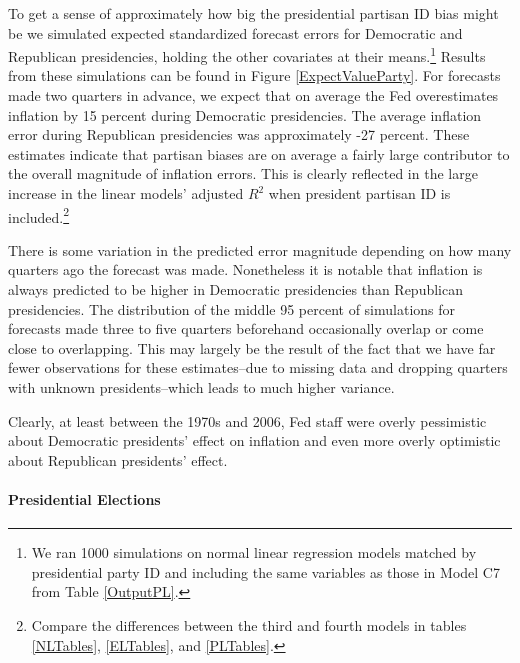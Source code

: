 \documentclass[a4paper]{article}\usepackage{graphicx, color}
\begin{document}
To get a sense of approximately how big the presidential partisan ID bias might be we simulated expected standardized forecast errors for Democratic and Republican presidencies, holding the other covariates at their means.\footnote{We ran 1000 simulations on normal linear regression models matched by presidential party ID and including the same variables as those in Model C7 from Table \ref{OutputPL}.} Results from these simulations can be found in Figure \ref{ExpectValueParty}. For forecasts made two quarters in advance, we expect that on average the Fed overestimates inflation by 15 percent during Democratic presidencies. The average inflation error during Republican presidencies was approximately -27 percent. These estimates indicate that partisan biases are on average a fairly large contributor to the overall magnitude of inflation errors. This is clearly reflected in the large increase in the linear models' adjusted $R^{2}$ when president partisan ID is included.\footnote{Compare the differences between the third and fourth models in tables \ref{NLTables}, \ref{ELTables}, and \ref{PLTables}.} 

There is some variation in the predicted error magnitude depending on how many quarters ago the forecast was made. Nonetheless it is notable that inflation is always predicted to be higher in Democratic presidencies than Republican presidencies. The distribution of the middle 95 percent of simulations for forecasts made three to five quarters beforehand occasionally overlap or come close to overlapping. This may largely be the result of the fact that we have far fewer observations for these estimates--due to missing data and dropping quarters with unknown presidents--which leads to much higher variance.

Clearly, at least between the 1970s and 2006, Fed staff were overly pessimistic about Democratic presidents' effect on inflation and even more overly optimistic about Republican presidents' effect. 

\paragraph{Presidential Elections}
\end{document}
